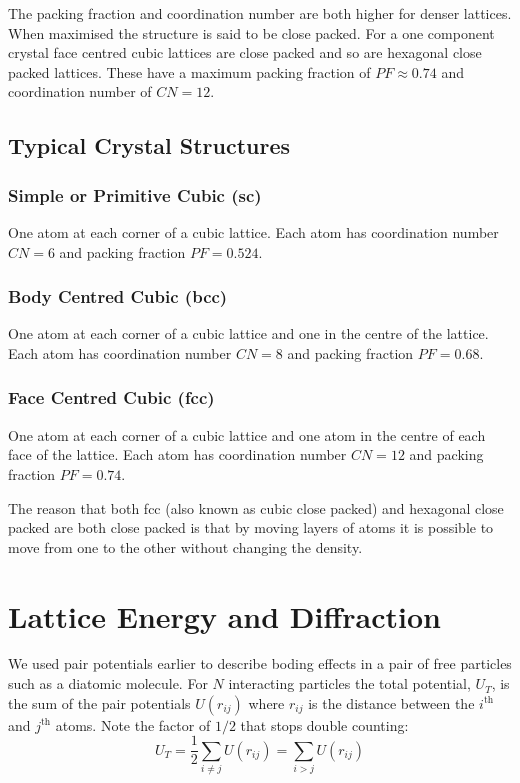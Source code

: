     The packing fraction and coordination number are both higher for denser lattices.
    When maximised the structure is said to be close packed.
    For a one component crystal face centred cubic lattices are close packed and so are hexagonal close packed lattices.
    These have a maximum packing fraction of \(PF \approx 0.74\) and coordination number of \(CN = 12\).
    
    \subsection{Typical Crystal Structures}
    \subsubsection{Simple or Primitive Cubic (sc)}
    One atom at each corner of a cubic lattice.
    Each atom has coordination number \(CN = 6\) and packing fraction \(PF = 0.524\).
    \subsubsection{Body Centred Cubic (bcc)}
    One atom at each corner of a cubic lattice and one in the centre of the lattice.
    Each atom has coordination number \(CN = 8\) and packing fraction \(PF = 0.68\).
    \subsubsection{Face Centred Cubic (fcc)}
    One atom at each corner of a cubic lattice and one atom in the centre of each face of the lattice.
    Each atom has coordination number \(CN = 12\) and packing fraction \(PF = 0.74\).
    
    The reason that both fcc (also known as cubic close packed) and hexagonal close packed are both close packed is that by moving layers of atoms it is possible to move from one to the other without changing the density.
    
    \section{Lattice Energy and Diffraction}
    We used pair potentials earlier to describe boding effects in a pair of free particles such as a diatomic molecule.
    For \(N\) interacting particles the total potential, \(U_T\), is the sum of the pair potentials \(U(r_{ij})\) where \(r_{ij}\) is the distance between the \(i^\text{th}\) and \(j^\text{th}\) atoms.
    Note the factor of \(1/2\) that stops double counting:
    \[U_T = \frac{1}{2}\sum_{i\ne j}U(r_{ij}) = \sum_{i>j}U(r_{ij})\]
    
